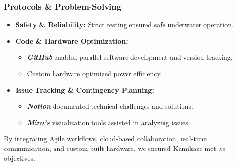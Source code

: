 \subsubsection{Protocols \& Problem-Solving}
\vspace{-0.5\baselineskip}
\begin{itemize}[leftmargin=0pt, itemindent=20pt]
    \setlength{\itemsep}{0pt}
    \item \textbf{Safety \& Reliability:} Strict testing ensured safe underwater operation.
    \item \textbf{Code \& Hardware Optimization:}
    \vspace{-0.5\baselineskip}
    \begin{itemize}[leftmargin=35pt, itemindent=0pt]
        \setlength{\itemsep}{0pt}
        \item \textbf{\textit{GitHub}} enabled parallel software development and version tracking.
        \item Custom hardware optimized power efficiency.
    \end{itemize}
    \item \textbf{Issue Tracking \& Contingency Planning:}
    \vspace{-0.5\baselineskip}
    \begin{itemize}[leftmargin=35pt, itemindent=0pt]
        \setlength{\itemsep}{0pt}
        \item \textbf{\textit{Notion}} documented technical challenges and solutions.
        \item \textbf{\textit{Miro’s}} visualization tools assisted in analyzing issues.
    \end{itemize}
\end{itemize}

By integrating Agile workflows, cloud-based collaboration, real-time communication, and custom-built hardware, we ensured Kamikaze met its objectives.